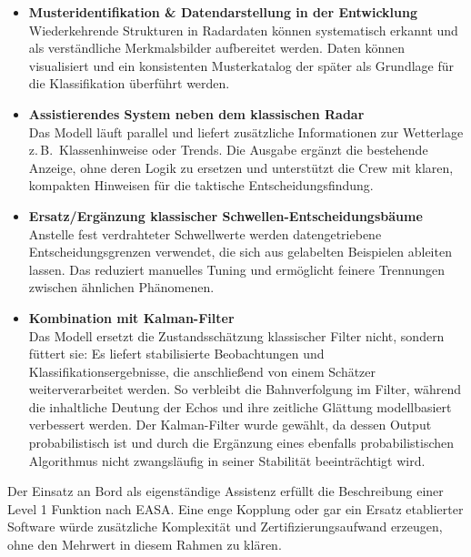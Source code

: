 \medskip
\begin{itemize}
  \item \textbf{Musteridentifikation \& Datendarstellung in der Entwicklung}\\
  Wiederkehrende Strukturen in Radardaten können systematisch erkannt und als
  verständliche Merkmalsbilder aufbereitet werden. 
  Daten können visualisiert und ein konsistenten Musterkatalog 
  der später als Grundlage für die Klassifikation überführt werden.

  \item \textbf{Assistierendes System neben dem klassischen Radar}\\
  Das Modell läuft parallel und liefert zusätzliche Informationen zur Wetterlage
  z.\,B.\ Klassenhinweise oder Trends. Die Ausgabe ergänzt die bestehende Anzeige,
  ohne deren Logik zu ersetzen und unterstützt die Crew mit klaren, kompakten Hinweisen für die
  taktische Entscheidungsfindung.

  \item \textbf{Ersatz/Ergänzung klassischer Schwellen-Entscheidungsbäume}\\
  Anstelle fest verdrahteter Schwellwerte werden datengetriebene Entscheidungsgrenzen verwendet,
  die sich aus gelabelten Beispielen ableiten lassen. Das reduziert manuelles Tuning und 
  ermöglicht feinere Trennungen zwischen ähnlichen Phänomenen.

  \item \textbf{Kombination mit Kalman-Filter}\\
  Das Modell ersetzt die Zustandsschätzung klassischer Filter nicht, sondern füttert sie:
  Es liefert stabilisierte Beobachtungen und Klassifikationsergebnisse,
  die anschließend von einem Schätzer weiterverarbeitet werden. So verbleibt die Bahnverfolgung im
  Filter, während die inhaltliche Deutung der Echos und ihre zeitliche Glättung modellbasiert verbessert werden.
  Der Kalman-Filter wurde gewählt, da dessen Output
  probabilistisch ist und durch die Ergänzung eines ebenfalls probabilistischen Algorithmus nicht
  zwangsläufig in seiner Stabilität beeinträchtigt wird.
\end{itemize}

\medskip
Der Einsatz an Bord als eigenständige Assistenz erfüllt die Beschreibung einer Level 1 Funktion nach EASA. 
Eine enge Kopplung oder gar ein Ersatz etablierter Software würde zusätzliche Komplexität 
und Zertifizierungsaufwand erzeugen, ohne den Mehrwert in diesem Rahmen zu klären. 




